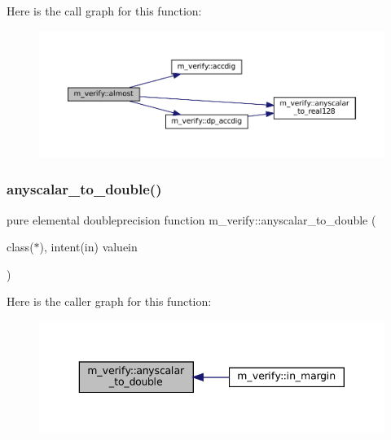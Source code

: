 Here is the call graph for this function\+:\nopagebreak
\begin{figure}[H]
\begin{center}
\leavevmode
\includegraphics[width=350pt]{namespacem__verify_ac5b0a0323929702a4b9e3fb918ea19b3_cgraph}
\end{center}
\end{figure}
\mbox{\label{namespacem__verify_a92278514bcbb93fefca1d925e3dfba65}} 
\subsubsection{\texorpdfstring{anyscalar\+\_\+to\+\_\+double()}{anyscalar\_to\_double()}}
{\footnotesize\ttfamily pure elemental doubleprecision function m\+\_\+verify\+::anyscalar\+\_\+to\+\_\+double (\begin{DoxyParamCaption}\item[{class($\ast$), intent(in)}]{valuein }\end{DoxyParamCaption})\hspace{0.3cm}{\ttfamily [private]}}

Here is the caller graph for this function\+:\nopagebreak
\begin{figure}[H]
\begin{center}
\leavevmode
\includegraphics[width=343pt]{namespacem__verify_a92278514bcbb93fefca1d925e3dfba65_icgraph}
\end{center}
\end{figure}
\mbox{\label{namespacem__verify_ab08d7bdca3b5d5e99732919be5880dc4}} 
